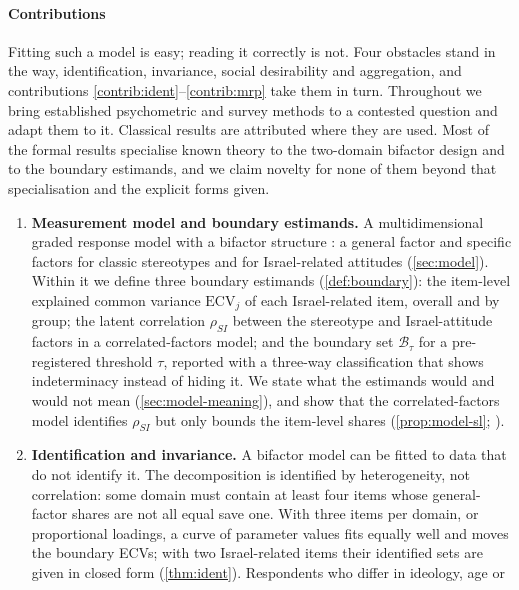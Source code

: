 \paragraph{Contributions}
Fitting such a model is easy; reading it correctly is not. Four obstacles
stand in the way, identification, invariance, social desirability and
aggregation, and contributions \ref{contrib:ident}--\ref{contrib:mrp} take
them in turn. Throughout we bring established psychometric and survey methods
to a contested question and adapt them to it. Classical results are
attributed where they are used. Most of the formal results specialise known
theory to the two-domain bifactor design and to the boundary estimands, and
we claim novelty for none of them beyond that specialisation and the explicit
forms given.
\begin{enumerate}[label=\textbf{C\arabic*},ref=C\arabic*,leftmargin=2.4em,itemsep=3pt]
  \item\label{contrib:model} \textbf{Measurement model and boundary
  estimands.} A multidimensional graded response model
  \citep{samejima1969,birnbaum1968,lord1980} with a bifactor structure
  \citep{gibbons1992,reise2012}: a general factor and specific factors for
  classic stereotypes and for Israel-related attitudes (\cref{sec:model}).
  Within it we define three boundary estimands (\cref{def:boundary}): the
  item-level explained common variance $\mathrm{ECV}_j$
  \citep{rodriguez2016} of each Israel-related item, overall and by group;
  the latent correlation $\rho_{SI}$ between the stereotype and
  Israel-attitude factors in a correlated-factors model; and the boundary set
  $\mathcal{B}_\tau$ for a pre-registered threshold $\tau$, reported with a
  three-way classification that shows indeterminacy instead of hiding it. We
  state what the estimands would and would not mean
  (\cref{sec:model-meaning}), and show that the correlated-factors model
  identifies $\rho_{SI}$ but only bounds the item-level shares
  (\cref{prop:model-sl}; \citealp{schmid1957}).
  \item\label{contrib:ident} \textbf{Identification and invariance.}
  A bifactor model can be fitted to data that do not identify it. The
  decomposition is identified by heterogeneity, not correlation: some domain
  must contain at least four items whose general-factor shares are not all
  equal save one. With three items per domain, or proportional loadings, a
  curve of parameter values fits equally well and moves the boundary ECVs;
  with two Israel-related items their identified sets are given in closed
  form (\cref{thm:ident}). Respondents who differ in ideology, age or

\end{enumerate}

